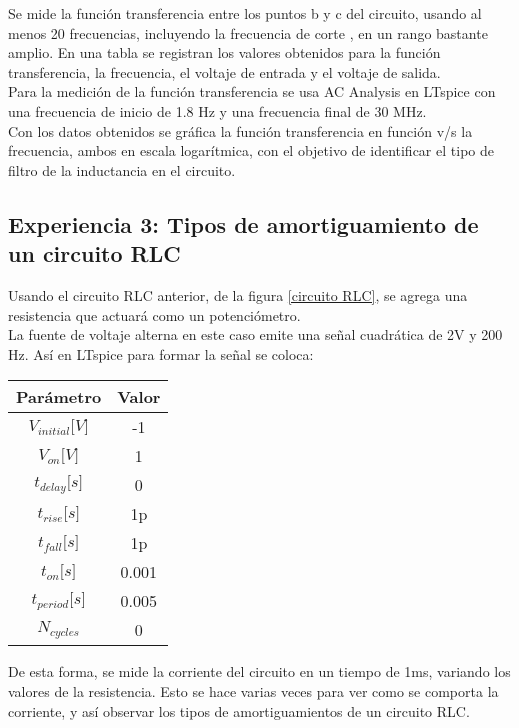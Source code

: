 \documentclass[letterpaper,11pt]{article} %
\begin{document}
Se mide la función transferencia entre los puntos b y c del circuito, usando al menos 20 frecuencias, incluyendo la frecuencia de corte , en un rango bastante amplio. En una tabla se registran los valores obtenidos para la función transferencia, la frecuencia, el voltaje de entrada y el voltaje de salida. \\

Para la medición de la función transferencia se usa AC Analysis en LTspice con una frecuencia de inicio de 1.8 Hz y una frecuencia final de 30 MHz.\\

Con los datos obtenidos se gráfica la función transferencia en función v/s la frecuencia, ambos en escala logarítmica, con el objetivo de identificar el tipo de filtro de la inductancia en el circuito.

\subsection{Experiencia 3: Tipos de amortiguamiento de un circuito RLC}


Usando el circuito RLC anterior, de la figura \ref{circuito RLC}, se agrega una resistencia que actuará como un potenciómetro.\\

La fuente de voltaje alterna en este caso emite una señal cuadrática de 2V y 200 Hz. Así en LTspice para formar la señal se coloca:

\begin{center}
\begin{tabular}{|c|c|}
\hline
\textbf{Parámetro}   & \textbf{Valor} \\ \hline
$V_{initial}{[}V{]}$ & -1             \\ \hline
$V_{on}{[}V{]}$      & 1              \\ \hline
$t_{delay}{[}s{]}$   & 0              \\ \hline
$t_{rise}{[}s{]}$    & 1p             \\ \hline
$t_{fall}{[}s{]}$    & 1p             \\ \hline
$t_{on}{[}s{]}$      & 0.001          \\ \hline
$t_{period}{[}s{]}$  & 0.005          \\ \hline
$N_{cycles}$         & 0              \\ \hline
\end{tabular}
\end{center}

De esta forma, se mide la corriente del circuito en un tiempo de 1ms, variando los valores de la resistencia. Esto se hace varias veces para ver como se comporta la corriente, y así observar los tipos de amortiguamientos de un circuito RLC. \\
\end{document}
